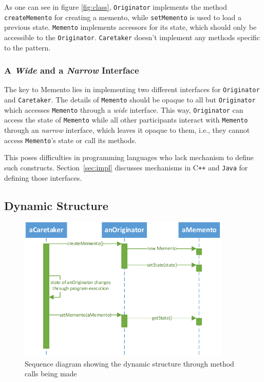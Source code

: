 \documentclass[11pt, a4paper, twoside]{article}
\def\cpp{C{}\texttt{++}}
\begin{document}
	As one can see in figure \ref{fig:class}, \verb|Originator| implements the method \verb|createMemento| for creating a memento, while \verb|setMemento| is used to load a previous state. \verb|Memento| implements accessors for its state, which should only be accessible to the \verb|Originator|. \verb|Caretaker| doesn't implement any methods specific to the pattern.
	
	\subsubsection{A \emph{Wide} and a \emph{Narrow} Interface}
	
	The key to Memento lies in implementing two different interfaces for \verb|Originator| and \verb|Caretaker|. The details of \verb|Memento| should be opaque to all but \verb|Originator| which accesses \verb|Memento| through a \emph{wide} interface. This way, \verb|Originator| can access the state  of \verb|Memento| while all other participants interact with \verb|Memento| through an \emph{narrow} interface, which leaves it opaque to them, i.e., they cannot access \verb|Memento|'s state or call its methods.
	
	This poses difficulties in programming languages who lack mechanism to define such constructs. Section~\ref{sec:impl} discusses mechanisms in \cpp{} and \verb|Java| for defining those interfaces.
	
	\subsection{Dynamic Structure}
	
	\begin{figure}[htb]
		\begin{center}
			\includegraphics[width=0.9\textwidth]{sequence_diagram.pdf}
			\caption{Sequence diagram showing the dynamic structure through method calls being made}
			\label{fig:sequence}
		\end{center}
	\end{figure}
	
\end{document}
